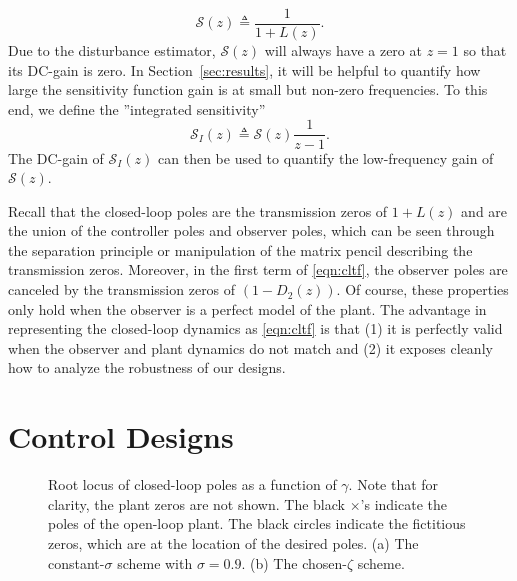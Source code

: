 \documentclass[twocolumn,twoside]{IEEEtran}
\begin{document}
\begin{equation}
  \mathcal{S}(z)\triangleq \frac{1}{1+L(z)}.\label{eqn:Sens}
\end{equation}
Due to the disturbance estimator, $\mathcal{S}(z)$ will always have a zero at $z=1$ so that its DC-gain is zero. In Section~\ref{sec:results}, it will be helpful to quantify how large the sensitivity function gain is at small but non-zero frequencies. To this end, we define the ''integrated sensitivity''
\begin{equation}
\mathcal{S}_I(z)\triangleq \mathcal{S}(z)\frac{1}{z-1} \label{eqn:S_int}.
\end{equation}
The DC-gain of $\mathcal{S}_I(z)$ can then be used to quantify the low-frequency gain of $\mathcal{S}(z)$.

Recall that the closed-loop poles are the transmission zeros of $1+L(z)$ and are the union of the controller poles and observer poles, which can be seen through the separation principle or manipulation of the matrix pencil describing the transmission zeros. Moreover, in the first term of \eqref{eqn:cltf}, the observer poles are canceled by the transmission zeros of $(1-D_2(z))$. Of course, these properties only hold when the observer is a perfect model of the plant. The advantage in representing the closed-loop dynamics as \eqref{eqn:cltf} is that (1) it is perfectly valid when the observer and plant dynamics do not match and (2) it exposes cleanly how to analyze the robustness of our designs. 


%   


\section{Control Designs}\label{sec:tune}
\begin{figure*}
    \begin{subfigure}{0.48\textwidth}
  
\caption{}
  \label{fig:lqr_locus_cs}
\end{subfigure}
\hfill
\begin{subfigure}{0.48\textwidth}
  
  \caption{}
  \label{fig:lqr_locus_cz}
\end{subfigure}
\caption{Root locus of closed-loop poles as a function of $\gamma$. Note that for clarity, the plant zeros are not shown. The black $\times$'s indicate the poles of the open-loop plant. The black circles indicate the fictitious zeros, which are at the location of the desired poles. (a) The constant-$\sigma$ scheme with $\sigma=0.9$. (b) The chosen-$\zeta$ scheme.}
\label{fig:lqr_locus}
\end{figure*}
\end{document}
